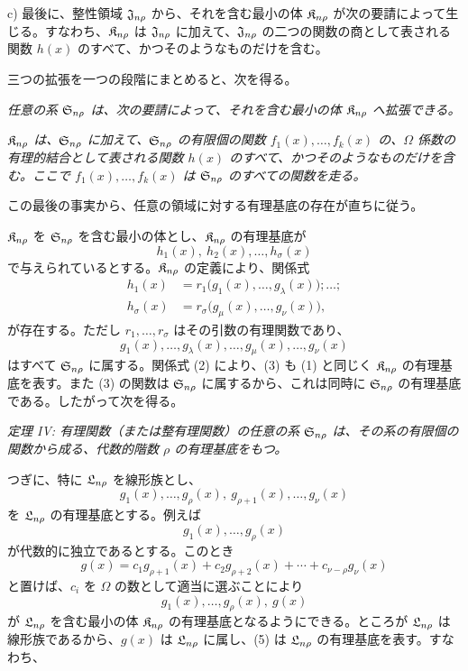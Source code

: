 \documentclass[11pt]{article}
\begin{document}
c) 最後に、整性領域 $\mathfrak{J}_{n\rho}$ から、それを含む最小の体 $\mathfrak{K}_{n\rho}$ が次の要請によって生じる。すなわち、$\mathfrak{K}_{n\rho}$ は $\mathfrak{J}_{n\rho}$ に加えて、$\mathfrak{J}_{n\rho}$ の二つの関数の商として表される関数 $h(x)$ のすべて、かつそのようなものだけを含む。

三つの拡張を一つの段階にまとめると、次を得る。

\emph{任意の系 $\mathfrak{S}_{n\rho}$ は、次の要請によって、それを含む最小の体 $\mathfrak{K}_{n\rho}$ へ拡張できる。}

\emph{$\mathfrak{K}_{n\rho}$ は、$\mathfrak{S}_{n\rho}$ に加えて、$\mathfrak{S}_{n\rho}$ の有限個の関数 $f_1(x),\ldots,f_k(x)$ の、$\Omega$ 係数の有理的結合として表される関数 $h(x)$ のすべて、かつそのようなものだけを含む。ここで $f_1(x),\ldots,f_k(x)$ は $\mathfrak{S}_{n\rho}$ のすべての関数を走る。}

この最後の事実から、任意の領域に対する有理基底の存在が直ちに従う。

$\mathfrak{K}_{n\rho}$ を $\mathfrak{S}_{n\rho}$ を含む最小の体とし、$\mathfrak{K}_{n\rho}$ の有理基底が
\begin{equation}
  h_1(x),\ h_2(x),\ldots,h_\sigma(x)
\tag{1}
\end{equation}
で与えられているとする。$\mathfrak{K}_{n\rho}$ の定義により、関係式
\begin{equation}
\begin{aligned}
 h_1(x)&=r_1\bigl(g_1(x),\ldots,g_\lambda(x)\bigr);\ldots;\\
 h_\sigma(x)&=r_\sigma\bigl(g_\mu(x),\ldots,g_\nu(x)\bigr),
\end{aligned}
\tag{2}
\end{equation}
が存在する。ただし $r_1,\ldots,r_\sigma$ はその引数の有理関数であり、
\begin{equation}
  g_1(x),\ldots,g_\lambda(x),\ldots,
  g_\mu(x),\ldots,g_\nu(x)
\tag{3}
\end{equation}
はすべて $\mathfrak{S}_{n\rho}$ に属する。関係式 (2) により、(3) も (1) と同じく $\mathfrak{K}_{n\rho}$ の有理基底を表す。また (3) の関数は $\mathfrak{S}_{n\rho}$ に属するから、これは同時に $\mathfrak{S}_{n\rho}$ の有理基底である。したがって次を得る。

\emph{定理 IV: 有理関数（または整有理関数）の任意の系 $\mathfrak{S}_{n\rho}$ は、その系の有限個の関数から成る、代数的階数 $\rho$ の有理基底をもつ。}

つぎに、特に $\mathfrak{L}_{n\rho}$ を線形族とし、
\begin{equation}
  g_1(x),\ldots,g_\rho(x),\ g_{\rho+1}(x),\ldots,g_\nu(x)
\tag{4}
\end{equation}
を $\mathfrak{L}_{n\rho}$ の有理基底とする。例えば
\[
  g_1(x),\ldots,g_\rho(x)
\]
が代数的に独立であるとする。このとき
\[
  g(x)=c_1g_{\rho+1}(x)+c_2g_{\rho+2}(x)+\cdots+c_{\nu-\rho}g_\nu(x)
\]
と置けば、$c_i$ を $\Omega$ の数として適当に選ぶことにより
\begin{equation}
  g_1(x),\ldots,g_\rho(x),\ g(x)
\tag{5}
\end{equation}
が $\mathfrak{L}_{n\rho}$ を含む最小の体 $\mathfrak{K}_{n\rho}$ の有理基底となるようにできる。ところが $\mathfrak{L}_{n\rho}$ は線形族であるから、$g(x)$ は $\mathfrak{L}_{n\rho}$ に属し、(5) は $\mathfrak{L}_{n\rho}$ の有理基底を表す。すなわち、
\end{document}
